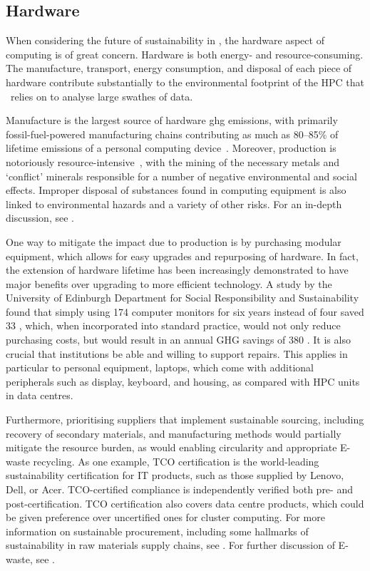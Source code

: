 \documentclass[../SustainableHEP.tex]{subfiles}
\begin{document}

\newpage

\subsection{Hardware}
\label{subsec:hardware}

When considering the future of sustainability in \ACR, the hardware aspect of computing is of great concern. Hardware is both energy- and resource-consuming. The manufacture, transport, energy consumption, and disposal of each piece of hardware contribute substantially to the environmental footprint of the HPC that \ACR\ relies on to analyse large swathes of data. 

Manufacture is the largest source of hardware \acrshort{ghg} emissions, with primarily fossil-fuel-powered manufacturing chains contributing as much as 80--85\% of lifetime emissions of a personal computing device~\cite{Greenpeace_Oeko, OxfordLCA}.  Moreover, production is notoriously resource-intensive~\cite{Greenpeace_Oeko}, with the mining of the necessary metals and `conflict' minerals responsible for a number of negative environmental and social effects.  Improper disposal of substances found in computing equipment is also linked to environmental hazards and a variety of other risks.    For an in-depth discussion, see .

One way to mitigate the impact due to production is by purchasing modular equipment, which allows for easy upgrades and repurposing of hardware.  In fact, the extension of hardware lifetime has been increasingly demonstrated to have major benefits over upgrading to more efficient technology.  A study by the University of Edinburgh Department for Social Responsibility and Sustainability~\cite{UniEd} found that simply using 174 computer monitors for six years instead of four saved 33 \tCdOe, which, when incorporated into standard practice, would not only reduce purchasing costs, but would result in an annual GHG savings of 380 \tCdOe.  It is also crucial that institutions be able and willing to support repairs. This applies in particular to personal equipment, \eg laptops,  which come with additional peripherals such as display, keyboard, and housing, as compared with HPC units in data centres. 

Furthermore, prioritising suppliers that implement sustainable sourcing, including recovery of secondary materials, and manufacturing methods would partially mitigate the resource burden, as would enabling circularity and appropriate E-waste recycling.  As one example, TCO certification \cite{TCO_Certified} is the world-leading sustainability certification for IT products, such as those supplied by Lenovo, Dell, or Acer. TCO-certified compliance is independently verified both pre- and post-certification. TCO certification also covers data centre products, which could be given preference over uncertified ones for cluster computing. For more information on sustainable procurement, including some hallmarks of sustainability in raw materials supply chains, see .  For further discussion of E-waste, see .
\end{document}
